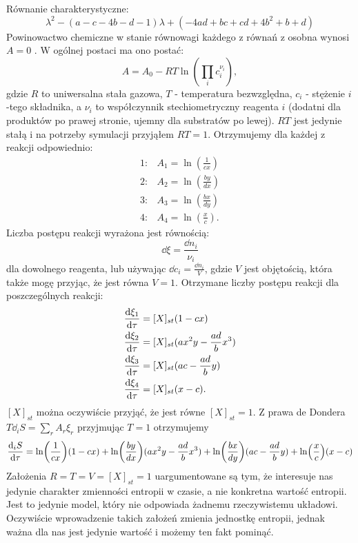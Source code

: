 \documentclass[10pt, a4paper, twoside, onecolumn]{article}
\numberwithin{equation}{section}
\begin{document}
	Równanie charakterystyczne:
	\begin{equation}
		\lambda^{2} - (a - c - 4b - d - 1)\lambda + (-4ad + bc + cd + 4b^{2} + b + d)
	\end{equation}
	Powinowactwo chemiczne w stanie równowagi każdego z równań z osobna wynosi \(A=0\) \cite{pigon1}. W ogólnej postaci ma ono postać:
	\begin{equation}
		A = A_{0} - RT\ln(\prod_{i}c_{i}^{\nu_{i}}), 
	\end{equation}
	gdzie \(R\) to uniwersalna stała gazowa, \(T\) - temperatura bezwzględna, \(c_{i}\) - stężenie \(i\)-tego składnika, a \(\nu_{i}\) to współczynnik stechiometryczny reagenta \(i\) (dodatni dla produktów po prawej stronie, ujemny dla substratów po lewej). \(RT\) jest jedynie stałą i na potrzeby symulacji przyjąłem \(RT=1\). Otrzymujemy dla każdej z reakcji odpowiednio:
	\begin{align}
		1: & A_{1} = \ln(\frac{1}{cx}) \\
		2: & A_{2} = \ln(\frac{by}{dx}) \\
		3: & A_{3} = \ln(\frac{bx}{dy}) \\
		4: & A_{4} = \ln(\frac{x}{c}).
	\end{align}
	Liczba postępu reakcji wyrażona jest równością: 
	\begin{equation}
		\dd{\xi} = \frac{\dd{n_{i}}}{\nu_{i}}
	\end{equation}
	dla dowolnego reagenta, lub używając \(\dd{c_{i}} = \frac{\dd{n_{i}}}{V}\), gdzie \(V\) jest objętością, która także mogę przyjąc, że jest równa \(V=1\). Otrzymane liczby postępu reakcji dla poszczególnych reakcji:
	\begin{align}
		\dv{\xi_{1}}{\tau} &= [X]_{st}(1 - cx) \\
		\dv{\xi_{2}}{\tau} &= [X]_{st}(ax^{2}y - \frac{ad}{b}x^{3}) \\
		\dv{\xi_{3}}{\tau} &= [X]_{st}(ac - \frac{ad}{b}y) \\
		\dv{\xi_{4}}{\tau} &= [X]_{st}(x - c).
	\end{align}
	\([X]_{st}\) można oczywiście przyjąć, że jest równe \([X]_{st}=1\). Z prawa de Dondera \(T\dd_{i}S=\sum_{r}A_{r}\xi_{r}\) przyjmując \(T=1\) otrzymujemy
	\begin{equation}
		\dv{_{i}S}{\tau} = \ln(\frac{1}{cx})(1 - cx) + \ln(\frac{by}{dx})(ax^{2}y - \frac{ad}{b}x^{3}) + \ln(\frac{bx}{dy})(ac - \frac{ad}{b}y) + \ln(\frac{x}{c})(x - c)
	\end{equation}
	Założenia \(R=T=V=[X]_{st}=1\) uargumentowane są tym, że interesuje nas jedynie charakter zmienności entropii w czasie, a nie konkretna wartość entropii. Jest to jedynie model, który nie odpowiada żadnemu rzeczywistemu układowi. Oczywiście wprowadzenie takich założeń zmienia jednostkę entropii, jednak ważna dla nas jest jedynie wartość i możemy ten fakt pominąć. \par
\end{document}
